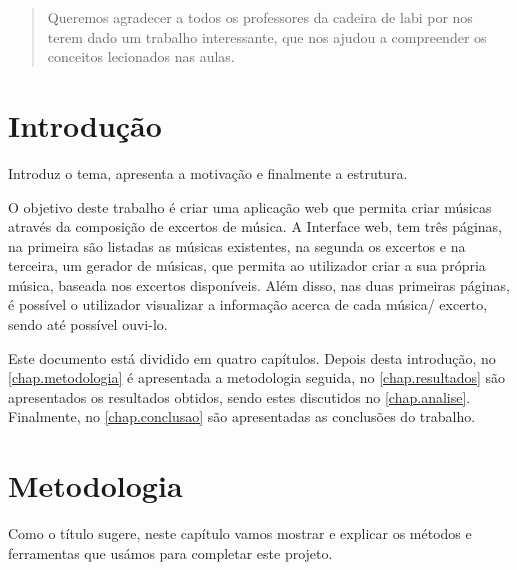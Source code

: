 \documentclass{report}
\begin{document}
\renewcommand{\abstractname}{Agradecimentos}
\begin{abstract}
Queremos agradecer a todos os professores da cadeira de \ac{labi} por nos terem
dado um trabalho interessante, que nos ajudou a compreender os conceitos
lecionados nas aulas.
\end{abstract}


\tableofcontents


\clearpage
{}


\chapter{Introdução}
\label{chap.introducao}

Introduz o tema, apresenta a motivação e finalmente a estrutura.

O objetivo deste trabalho é criar uma aplicação web que permita criar músicas através da 
composição de excertos de música. A Interface web, tem três páginas, na primeira são 
listadas as músicas existentes, na segunda os excertos e na terceira, um gerador de 
músicas, que permita ao utilizador criar a sua própria música, baseada nos excertos 
disponíveis. Além disso, nas duas primeiras páginas, é possível o utilizador visualizar a
informação acerca de cada música/ excerto, sendo até possível ouvi-lo.

Este documento está dividido em quatro capítulos.
Depois desta introdução,
no \autoref{chap.metodologia} é apresentada a metodologia seguida,
no \autoref{chap.resultados} são apresentados os resultados obtidos,
sendo estes discutidos no \autoref{chap.analise}.
Finalmente, no \autoref{chap.conclusao} são apresentadas
as conclusões do trabalho.


\chapter{Metodologia}
\label{chap.metodologia}
Como o título sugere, neste capítulo vamos mostrar e explicar os métodos e ferramentas 
que usámos para completar este projeto. 
\end{document}
